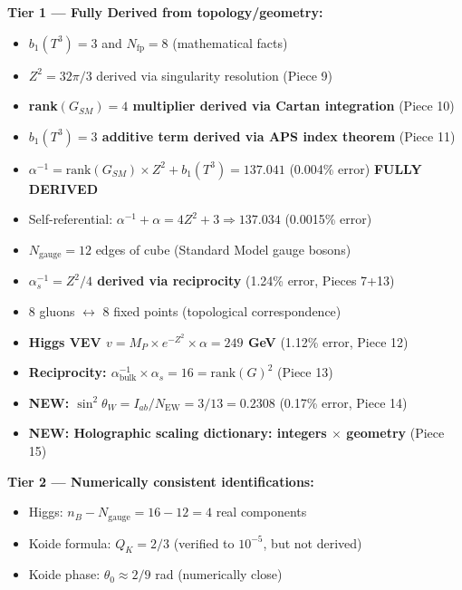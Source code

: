 \documentclass[12pt,a4paper]{article}
\newcommand{\sinW}{\sin^2\theta_W}
\newcommand{\Zsq}{Z^2}
\begin{document}
\begin{tcolorbox}[colback=red!5!white, colframe=red!60!black, title=Epistemic Classification of All Claims (v8.8.0)]
\textbf{Tier 1 --- Fully Derived from topology/geometry:}
\begin{itemize}[itemsep=0pt]
    \item $b_1(T^3) = 3$ and $N_{\text{fp}} = 8$ (mathematical facts)
    \item $\Zsq = 32\pi/3$ derived via singularity resolution (Piece 9)
    \item \textbf{rank$(G_{SM}) = 4$ multiplier derived via Cartan integration} (Piece 10)
    \item \textbf{$b_1(T^3) = 3$ additive term derived via APS index theorem} (Piece 11)
    \item $\alpha^{-1} = \text{rank}(G_{SM}) \times \Zsq + b_1(T^3) = 137.041$ (0.004\% error) \textbf{FULLY DERIVED}
    \item Self-referential: $\alpha^{-1} + \alpha = 4\Zsq + 3 \Rightarrow 137.034$ (0.0015\% error)
    \item $N_{\text{gauge}} = 12$ edges of cube (Standard Model gauge bosons)
    \item \textbf{$\alpha_s^{-1} = \Zsq/4$ derived via reciprocity} (1.24\% error, Pieces 7+13)
    \item 8 gluons $\leftrightarrow$ 8 fixed points (topological correspondence)
    \item \textbf{Higgs VEV $v = M_P \times e^{-\Zsq} \times \alpha = 249$ GeV} (1.12\% error, Piece 12)
    \item \textbf{Reciprocity: $\alpha^{-1}_{\text{bulk}} \times \alpha_s = 16 = \text{rank}(G)^2$} (Piece 13)
    \item \textbf{NEW: $\sinW = I_{ab}/N_{\text{EW}} = 3/13 = 0.2308$} (0.17\% error, Piece 14)
    \item \textbf{NEW: Holographic scaling dictionary: integers $\times$ geometry} (Piece 15)
\end{itemize}

\textbf{Tier 2 --- Numerically consistent identifications:}
\begin{itemize}[itemsep=0pt]
    \item Higgs: $n_B - N_{\text{gauge}} = 16 - 12 = 4$ real components
    \item Koide formula: $Q_K = 2/3$ (verified to $10^{-5}$, but not derived)
    \item Koide phase: $\theta_0 \approx 2/9$ rad (numerically close)
\end{itemize}


\end{tcolorbox}
\end{document}
